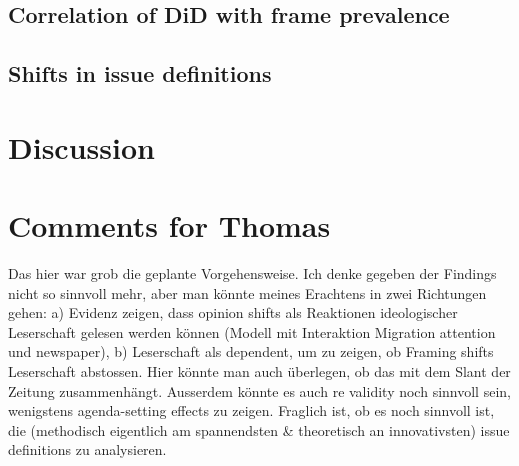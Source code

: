 \documentclass{article}
\begin{document}
\subsection{Correlation of DiD with frame prevalence}


\subsection{Shifts in issue definitions}


\section{Discussion}

\newpage

\section{Comments for Thomas}

Das hier war grob die geplante Vorgehensweise. Ich denke gegeben der Findings nicht so sinnvoll mehr, aber man könnte meines Erachtens in zwei Richtungen gehen: a) Evidenz zeigen, dass opinion shifts als Reaktionen ideologischer Leserschaft gelesen werden können (Modell mit Interaktion Migration attention und newspaper), b) Leserschaft als dependent, um zu zeigen, ob Framing shifts Leserschaft abstossen. Hier könnte man auch überlegen, ob das mit dem Slant der Zeitung zusammenhängt. Ausserdem könnte es auch re validity noch sinnvoll sein, wenigstens agenda-setting effects zu zeigen. Fraglich ist, ob es noch sinnvoll ist, die (methodisch eigentlich am spannendsten \& theoretisch an innovativsten) issue definitions zu analysieren.
\end{document}
